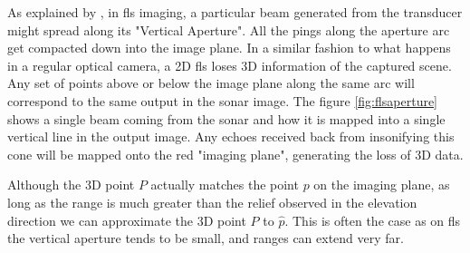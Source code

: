 As explained by \cite{Hurtos2015}, in \acrfull{fls} imaging, a particular beam generated from the transducer might spread along its "Vertical Aperture". All the pings along the aperture arc get compacted down into the image plane. In a similar fashion to what happens in a regular optical camera, a 2D \acrfull{fls} loses 3D information of the captured scene. Any set of points above or below the image plane along the same arc will correspond to the same output in the sonar image. The figure \ref{fig:flsaperture} shows a single beam coming from the sonar and how it is mapped into a single vertical line in the output image. Any echoes received back from insonifying this cone will be mapped onto the red "imaging plane", generating the loss of 3D data. 

Although the 3D point \(P\) actually matches the point \(p\) on the imaging plane, as long as the range is much greater than the relief observed in the elevation direction we can approximate the 3D point \(P\) to \(\hat{p}\). This is often the case as on \acrshort{fls} the vertical aperture tends to be small, and ranges can extend very far.



